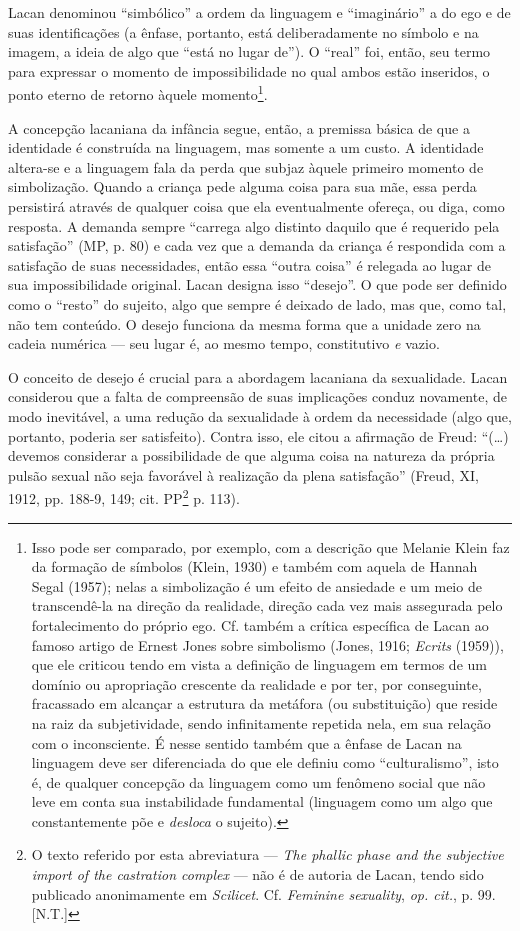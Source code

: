 Lacan denominou ``simbólico'' a ordem da linguagem e ``imaginário'' a do
ego e de suas identificações (a ênfase, portanto, está deliberadamente
no símbolo e na imagem, a ideia de algo que ``está no lugar de''). O
``real'' foi, então, seu termo para expressar o momento de
impossibilidade no qual ambos estão inseridos, o ponto eterno de retorno
àquele momento\footnote{Isso pode ser comparado, por exemplo, com a
  descrição que Melanie Klein faz da formação de símbolos (Klein, 1930)
  e também com aquela de Hannah Segal (1957); nelas a simbolização é um
  efeito de ansiedade e um meio de transcendê-la na direção da
  realidade, direção cada vez mais assegurada pelo fortalecimento do
  próprio ego. Cf. também a crítica específica de Lacan ao famoso artigo
  de Ernest Jones sobre simbolismo (Jones, 1916; \emph{Ecrits} (1959)),
  que ele criticou tendo em vista a definição de linguagem em termos de
  um domínio ou apropriação crescente da realidade e por ter, por
  conseguinte, fracassado em alcançar a estrutura da metáfora (ou
  substituição) que reside na raiz da subjetividade, sendo infinitamente
  repetida nela, em sua relação com o inconsciente. É nesse sentido
  também que a ênfase de Lacan na linguagem deve ser diferenciada do que
  ele definiu como ``culturalismo'', isto é, de qualquer concepção da
  linguagem como um fenômeno social que não leve em conta sua
  instabilidade fundamental (linguagem como um algo que constantemente
  põe e \emph{desloca} o sujeito).}.

A concepção lacaniana da infância segue, então, a premissa básica de que
a identidade é construída na linguagem, mas somente a um custo. A
identidade altera-se e a linguagem fala da perda que subjaz àquele
primeiro momento de simbolização. Quando a criança pede alguma coisa
para sua mãe, essa perda persistirá através de qualquer coisa que ela
eventualmente ofereça, ou diga, como resposta. A demanda sempre
``carrega algo distinto daquilo que é requerido pela satisfação'' (MP,
p. 80) e cada vez que a demanda da criança é respondida com a satisfação
de suas necessidades, então essa ``outra coisa'' é relegada ao lugar de
sua impossibilidade original. Lacan designa isso ``desejo''. O que pode
ser definido como o ``resto'' do sujeito, algo que sempre é deixado de
lado, mas que, como tal, não tem conteúdo. O desejo funciona da mesma
forma que a unidade zero na cadeia numérica --- seu lugar é, ao mesmo
tempo, constitutivo \emph{e} vazio.

O conceito de desejo é crucial para a abordagem lacaniana da
sexualidade. Lacan considerou que a falta de compreensão de suas
implicações conduz novamente, de modo inevitável, a uma redução da
sexualidade à ordem da necessidade (algo que, portanto, poderia ser
satisfeito). Contra isso, ele citou a afirmação de Freud: ``(\ldots{})
devemos considerar a possibilidade de que alguma coisa na natureza da
própria pulsão sexual não seja favorável à realização da plena
satisfação'' (Freud, XI, 1912, pp. 188-9, 149; cit. PP\footnote{O texto
  referido por esta abreviatura --- \emph{The phallic phase and the
  subjective import of the castration complex} --- não é de autoria de
  Lacan, tendo sido publicado anonimamente em \emph{Scilicet}. Cf.
  \emph{Feminine sexuality}, \emph{op. cit.}, p. 99. {[}N.T.{]}} p.
113).

